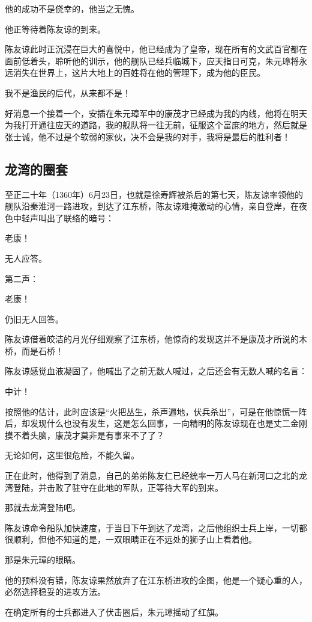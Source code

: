\begin{multicols}{\theparacolNo}
		他的成功不是侥幸的，他当之无愧。

		他正等待着陈友谅的到来。

		陈友谅此时正沉浸在巨大的喜悦中，他已经成为了皇帝，现在所有的文武百官都在面前低着头，聆听他的训示，他的舰队已经兵临城下，应天指日可克，朱元璋将永远消失在世界上，这片大地上的百姓将在他的管理下，成为他的臣民。

		我不是渔民的后代，从来都不是！

		好消息一个接着一个，安插在朱元璋军中的康茂才已经成为我的内线，他将在明天为我打开通往应天的道路，我的舰队将一往无前，征服这个富庶的地方，然后就是张士诚，他不过是个软弱的家伙，决不会是我的对手，我将是最后的胜利者！

		\subsection{龙湾的圈套}
		至正二十年（1360年）6月23日，也就是徐寿辉被杀后的第七天，陈友谅率领他的舰队沿秦淮河一路进攻，到达了江东桥，陈友谅难掩激动的心情，亲自登岸，在夜色中轻声叫出了联络的暗号：

		老康！

		无人应答。

		第二声：

		老康！

		仍旧无人回答。

		陈友谅借着皎洁的月光仔细观察了江东桥，他惊奇的发现这并不是康茂才所说的木桥，而是石桥！

		陈友谅感觉血液凝固了，他喊出了之前无数人喊过，之后还会有无数人喊的名言：

		中计！

		按照他的估计，此时应该是“火把丛生，杀声遍地，伏兵杀出”，可是在他惊慌一阵后，却发现什么也没有发生，这是怎么回事，一向精明的陈友谅现在也是丈二金刚摸不着头脑，康茂才莫非是有事来不了了？

		无论如何，这里很危险，不能久留。

		正在此时，他得到了消息，自己的弟弟陈友仁已经统率一万人马在新河口之北的龙湾登陆，并击败了驻守在此地的军队，正等待大军的到来。

		那就去龙湾登陆吧。

		陈友谅命令船队加快速度，于当日下午到达了龙湾，之后他组织士兵上岸，一切都很顺利，但他不知道的是，一双眼睛正在不远处的狮子山上看着他。

		那是朱元璋的眼睛。

		他的预料没有错，陈友谅果然放弃了在江东桥进攻的企图，他是一个疑心重的人，必然选择稳妥的进攻方法。

		在确定所有的士兵都进入了伏击圈后，朱元璋摇动了红旗。


\end{multicols}
